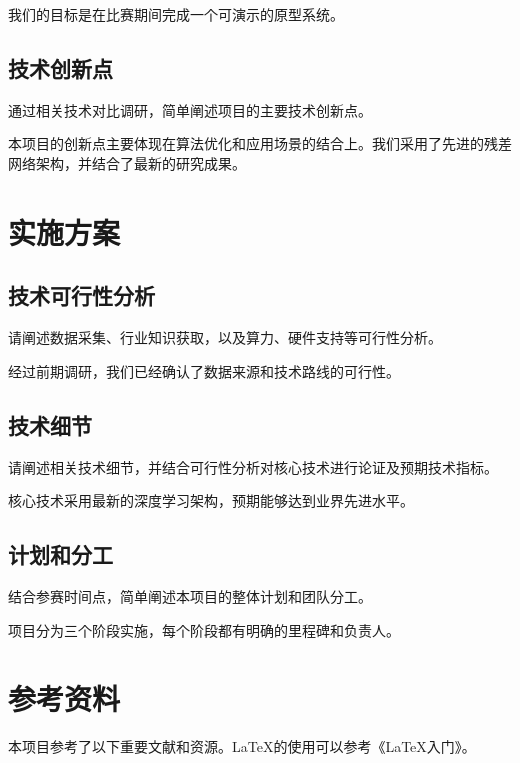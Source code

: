 \documentclass{cpipc}
\begin{document}
我们的目标是在比赛期间完成一个可演示的原型系统。

\subsection{技术创新点}

通过相关技术对比调研，简单阐述项目的主要技术创新点。

本项目的创新点主要体现在算法优化和应用场景的结合上。我们采用了先进的残差网络架构\cite{he2016deep}，并结合了最新的研究成果\cite{zhang2023deep,li2023neural}。

\section{实施方案}
\subsection{技术可行性分析}

请阐述数据采集、行业知识获取，以及算力、硬件支持等可行性分析。

经过前期调研，我们已经确认了数据来源和技术路线的可行性。

\subsection{技术细节}

请阐述相关技术细节，并结合可行性分析对核心技术进行论证及预期技术指标。

核心技术采用最新的深度学习架构，预期能够达到业界先进水平。

\subsection{计划和分工}

结合参赛时间点，简单阐述本项目的整体计划和团队分工。

项目分为三个阶段实施，每个阶段都有明确的里程碑和负责人。



\section{参考资料}

本项目参考了以下重要文献和资源。LaTeX的使用可以参考《LaTeX入门》\cite{liuhaiyang2013latex}。

\renewcommand{\refname}{}%


\end{document}
